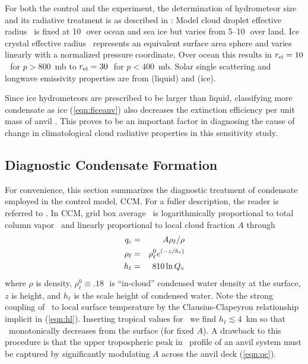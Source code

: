 \documentclass[twoside,agupp]{aguplus}
\begin{document}
For both the control and the experiment, the determination of
hydrometeor size and its radiative treatment is as described in
\cite{KBB96}: 
Model cloud droplet effective radius \rel\ is fixed at 10\,\um\ over
ocean and sea ice but varies from 5--10\,\um\ over land.
Ice crystal effective radius \rei\ represents an equivalent surface
area sphere and varies linearly with a normalized pressure coordinate.
Over ocean this results in $\mbox{$r_\mathrm{ei}$} = 10$\,\um\ for $p > 800$~mb to  
$\mbox{$r_\mathrm{ei}$} = 30$\,\um\ for $p < 400$~mb.
Solar single scattering and longwave emissivity properties are from
\cite{Sli89} (liquid) and \cite{EbC92} (ice).

Since ice hydrometeors are prescribed to be larger than liquid,
classifying more condensate as ice (\ref{eqn:ficeanv}) also decreases 
the extinction efficiency per unit mass of anvil
\cite[e.g.,][]{ZeK941}. 
This proves to be an important factor in diagnosing the cause of
change in climatological cloud radiative properties in this
sensitivity study.

\subsection{Diagnostic Condensate Formation}\label{sec:ccm}

For convenience, this section summarizes the diagnostic treatment of 
condensate employed in the control model, CCM.
For a fuller description, the reader is referred to \cite{KBB96}. 
In CCM, grid box average \qc\ is logarithmically proportional to
total column  vapor \Qv\ and linearly proportional to local cloud
fraction $A$ through
\begin{eqnarray}
\label{eqn:qc}
\qc & = & A \rho_\ell / \rho \\
\label{eqn:rhol}
\rho_\ell & = & \rho_\ell^0 e^{(-z/h_\ell)} \\
\label{eqn:hl}
h_\ell & = & 810 \ln \Qv
\end{eqnarray}
where $\rho$ is density, $\rho_\ell^0 \equiv .18$\,\gxmC\
is ``in-cloud'' condensed water density at the surface, $z$ is height,
and $h_\ell$ is the scale height of condensed water.
Note the strong coupling of \qc\ to local surface temperature by the
Clausius-Clapeyron relationship implicit in (\ref{eqn:hl}).
Inserting tropical values for \Qv\ we find $h_\ell \lesssim 4$~km so
that \qc\ monotonically decreases from the surface (for fixed $A$).
A drawback to this procedure is that the upper tropospheric peak in
\qc\ profile of an anvil system must be captured by significantly
modulating $A$ across the anvil deck (\ref{eqn:qc}).
\end{document}
